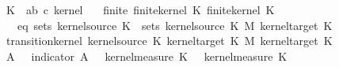 \begin{isabellebody}
{\ \ \ \ \ K{\isacharunderscore}{\kern0pt}{}\ {\isacharcolon}{\kern0pt}{\isacharcolon}{\kern0pt}\ {\isachardoublequoteopen}{\isacharparenleft}{\kern0pt}{\isacharprime}{\kern0pt}a{\isasymtimes}{\isacharprime}{\kern0pt}b{\isacharcomma}{\kern0pt}\ {\isacharprime}{\kern0pt}c{\isacharparenright}{\kern0pt}\ kernel{\isachardoublequoteclose}\isanewline
\ \ \ finite{\isacharcolon}{\kern0pt}\ {\isachardoublequoteopen}finite{\isacharunderscore}{\kern0pt}kernel\ K{\isacharunderscore}{\kern0pt}{}{\isachardoublequoteclose}\ {\isachardoublequoteopen}finite{\isacharunderscore}{\kern0pt}kernel\ K{\isacharunderscore}{\kern0pt}{}{\isachardoublequoteclose}\isanewline
\ \ \ \ \ \ \ eq{\isacharcolon}{\kern0pt}\ {\isachardoublequoteopen}sets\ {\isacharparenleft}{\kern0pt}kernel{\isacharunderscore}{\kern0pt}source\ K{\isacharunderscore}{\kern0pt}{}{\isacharparenright}{\kern0pt}\ {\isacharequal}{\kern0pt}\ sets\ {\isacharparenleft}{\kern0pt}kernel{\isacharunderscore}{\kern0pt}source\ K{\isacharunderscore}{\kern0pt}{}\ {\isasymOtimes}\isactrlsub M\ kernel{\isacharunderscore}{\kern0pt}target\ K{\isacharunderscore}{\kern0pt}{}{\isacharparenright}{\kern0pt}{\isachardoublequoteclose}\isanewline
\ \ \ \ \ {\isachardoublequoteopen}transition{\isacharunderscore}{\kern0pt}kernel\ {\isacharparenleft}{\kern0pt}kernel{\isacharunderscore}{\kern0pt}source\ K{\isacharunderscore}{\kern0pt}{}{\isacharparenright}{\kern0pt}\ {\isacharparenleft}{\kern0pt}kernel{\isacharunderscore}{\kern0pt}target\ K{\isacharunderscore}{\kern0pt}{}\ {\isasymOtimes}\isactrlsub M\ kernel{\isacharunderscore}{\kern0pt}target\ K{\isacharunderscore}{\kern0pt}{}{\isacharparenright}{\kern0pt}\isanewline
\ \ \ \ {\isacharparenleft}{\kern0pt}{\isasymlambda}{\isasymomega}\ A{\isachardot}{\kern0pt}\ {\isasymintegral}\isactrlsup {\isacharplus}{\kern0pt}{\isasymomega}\ {\isacharparenleft}{\kern0pt}{\isasymintegral}\isactrlsup {\isacharplus}{\kern0pt}{\isasymomega}\ indicator\ A\ {\isacharparenleft}{\kern0pt}{\isasymomega}\ {\isasymomega}\ {\isasympartial}kernel{\isacharunderscore}{\kern0pt}measure\ K{\isacharunderscore}{\kern0pt}{}\ {\isacharparenleft}{\kern0pt}{\isasymomega}\ {\isasymomega}\ {\isasympartial}kernel{\isacharunderscore}{\kern0pt}measure\ K{\isacharunderscore}{\kern0pt}{}\ {\isasymomega}\isanewline
}
\end{isabellebody}
